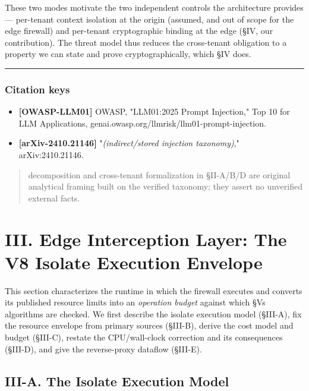 These two modes motivate the two independent controls the architecture
provides --- per-tenant context isolation at the origin (assumed, and
out of scope for the edge firewall) and per-tenant cryptographic binding
at the edge (§IV, our contribution). The threat model thus reduces the
cross-tenant obligation to a property we can state and prove
cryptographically, which §IV does.

\begin{center}\rule{0.5\linewidth}{0.5pt}\end{center}

\subsubsection{Citation keys}\label{citation-keys}

\begin{itemize}
\tightlist
\item
  \textbf{{[}OWASP-LLM01{]}} OWASP, "LLM01:2025 Prompt Injection," Top
  10 for LLM Applications,
  genai.owasp.org/llmrisk/llm01-prompt-injection.
\item
  \textbf{{[}arXiv-2410.21146{]}} "\emph{(indirect/stored injection
  taxonomy)}," arXiv:2410.21146.
\end{itemize}

\begin{quote}
decomposition and cross-tenant formalization in §II-A/B/D are original
analytical framing built on the verified taxonomy; they assert no
unverified external facts.
\end{quote}

\section{III. Edge Interception Layer: The V8 Isolate Execution
Envelope}\label{iii-edge-interception-layer-the-v8-isolate-execution-envelope}

This section characterizes the runtime in which the firewall executes
and converts its published resource limits into an \emph{operation
budget} against which §V\textquotesingle s algorithms are checked. We
first describe the isolate execution model (§III-A), fix the resource
envelope from primary sources (§III-B), derive the cost model and budget
(§III-C), restate the CPU/wall-clock correction and its consequences
(§III-D), and give the reverse-proxy dataflow (§III-E).

\subsection{III-A. The Isolate Execution
Model}\label{iii-a-the-isolate-execution-model}

